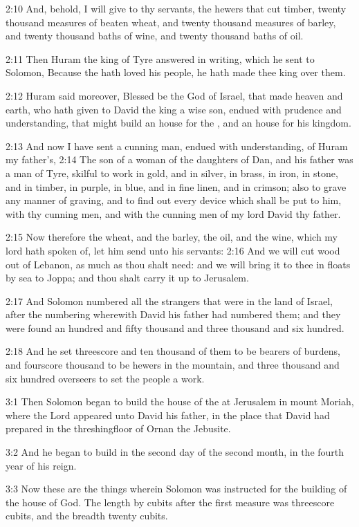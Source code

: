 2:10 And, behold, I will give to thy servants, the hewers that cut
timber, twenty thousand measures of beaten wheat, and twenty thousand
measures of barley, and twenty thousand baths of wine, and twenty
thousand baths of oil.

2:11 Then Huram the king of Tyre answered in writing, which he sent to
Solomon, Because the \LORD hath loved his people, he hath made thee
king over them.

2:12 Huram said moreover, Blessed be the \LORD God of Israel, that made
heaven and earth, who hath given to David the king a wise son, endued
with prudence and understanding, that might build an house for the
\LORD, and an house for his kingdom.

2:13 And now I have sent a cunning man, endued with understanding, of
Huram my father's, 2:14 The son of a woman of the daughters of Dan,
and his father was a man of Tyre, skilful to work in gold, and in
silver, in brass, in iron, in stone, and in timber, in purple, in
blue, and in fine linen, and in crimson; also to grave any manner of
graving, and to find out every device which shall be put to him, with
thy cunning men, and with the cunning men of my lord David thy father.

2:15 Now therefore the wheat, and the barley, the oil, and the wine,
which my lord hath spoken of, let him send unto his servants: 2:16 And
we will cut wood out of Lebanon, as much as thou shalt need: and we
will bring it to thee in floats by sea to Joppa; and thou shalt carry
it up to Jerusalem.

2:17 And Solomon numbered all the strangers that were in the land of
Israel, after the numbering wherewith David his father had numbered
them; and they were found an hundred and fifty thousand and three
thousand and six hundred.

2:18 And he set threescore and ten thousand of them to be bearers of
burdens, and fourscore thousand to be hewers in the mountain, and
three thousand and six hundred overseers to set the people a work.

3:1 Then Solomon began to build the house of the \LORD at Jerusalem in
mount Moriah, where the Lord appeared unto David his father, in the
place that David had prepared in the threshingfloor of Ornan the
Jebusite.

3:2 And he began to build in the second day of the second month, in
the fourth year of his reign.

3:3 Now these are the things wherein Solomon was instructed for the
building of the house of God. The length by cubits after the first
measure was threescore cubits, and the breadth twenty cubits.

